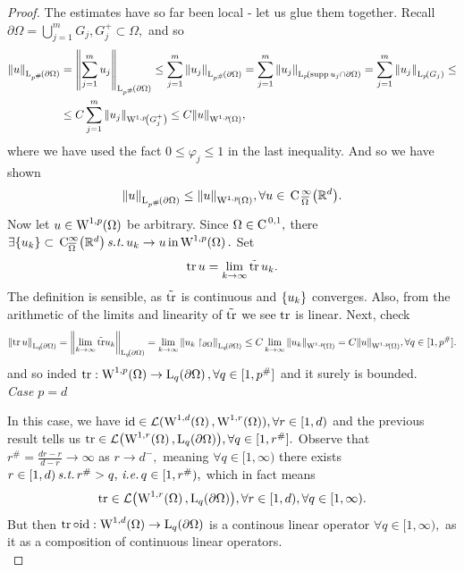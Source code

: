 \documentclass{article}
\begin{document}
\begin{proof}
	The estimates have so far been local - let us glue them together. Recall $\partial \Omega = \bigcup_{j=1}^m G_j,G_j^+ \subset \Omega,$ and so
	\begin{align*}
		\norm{u}_{\LpSet[p^{\#}]{\partial \Omega}} &= \norm{\sum_{j=1}^m u_j}_{\LpSet[p^{\#}]{\partial \Omega}}\leq \sum_{j=1}^m \norm{u_j}_{\LpSet[p^{\#}]{\partial \Omega}} = \sum_{j=1}^m \norm{u_j}_{\LpSet[p]{\supp u_j \cap \partial \Omega}} = \sum_{j=1}^m \norm{u_j}_{\LpSet[p]{G_j}} \leq \\
		&\leq C \sum_{j=1}^m \norm{u_j}_{\WkpSet[1][p]{G_j^{+}}} \leq C \norm{u}_{\WkpSet[1][p]{\Omega}},
	\end{align*}
	where we have used the fact $0 \leq \varphi_j \leq 1$ in the last inequality. And so we have shown
	\[
		\norm{u}_{\LpSet[p^{\#}]{\partial \Omega}} \leq \norm{u}_{\WkpSet[1][p]{\Omega}}, \forall u \in \, \text{C} \,^{\infty}_{\overline{\Omega}}\qty(\R^{d}).
	\]
	Now let $u \in \WkpSet[1][p]{\Omega}$ be arbitrary. Since $\Omega \in \text{C}^{\!\,\, 0,1},$ there $\exists \qty{u_k} \subset \, \text{C}^{\infty}_{\overline{\Omega}}\qty(\R^{d}) \, \text{\textit{s.t.}} \, u_k \to u \, \text{in} \, \WkpSet[1][p]{\Omega}.$ Set
	\[
		\trace u = \lim_{k\to \infty}\tilde{\trace}\, u_k.
	\]
	The definition is sensible, as $\tilde{\trace}$ is continuous and $\qty{u_k}$ converges. Also, from the arithmetic of the limits and linearity of $\tilde{\trace}$ we see $\trace$ is linear. Next, check
	\[
		\norm{\trace u}_{\LpSet[q]{\partial \Omega}} = \norm{\lim_{k\to \infty}\tilde{\trace}u_k}_{\LpSet[q]{\partial \Omega}} = \lim_{k \to \infty}\norm{u_k \restriction_{\partial \Omega}}_{\LpSet[q]{\partial \Omega}} \leq C \lim_{k\to \infty}\norm{u_k}_{\WkpSet[1][p]{\Omega}} = C \norm{u}_{\WkpSet[1][p]{\Omega}}, \forall q \in [1, p^{\#}].
	\]
	and so inded $\trace: \WkpSet[1][p]{\Omega} \to \LpSet[q]{\partial \Omega}, \forall q \in [1,p^{\#}]$ and it surely is bounded. \\


	\textit{Case $p=d$} 

	In this case, we have $\idop \in \mathcal{L}(\WkpSet[1][d]{\Omega},\WkpSet[1][r]{\Omega}), \forall r \in [1,d)$ and the previous result tells us $\trace \in \mathcal{L}\qty(\WkpSet[1][r]{\Omega},\LpSet[q]{\partial \Omega}), \forall q \in [1,r^{\#}].$ Observe that $r^{\#} = \frac{dr-r}{d-r} \to \infty$ as $r \to d^-,$ meaning $\forall q \in [1, \infty)$ there exists $r \in [1,d) \, \text{\textit{s.t.}} \, r^{\#} > q, \, \text{\textit{i.e.}} \, q \in [1,r^{\#}),$ which in fact means
	\[
		\trace \in \mathcal{L}\qty(\WkpSet[1][r]{\Omega}, \LpSet[q]{\partial \Omega}),\forall r \in [1,d), \forall q \in [1,\infty).
	\]
	But then $\trace \circ \idop: \WkpSet[1][d]{\Omega} \to \LpSet[q]{\partial \Omega}$ is a continous linear operator $\forall q \in [1,\infty),$ as it as a composition of continuous linear operators.
	\\



\end{proof}
\end{document}

